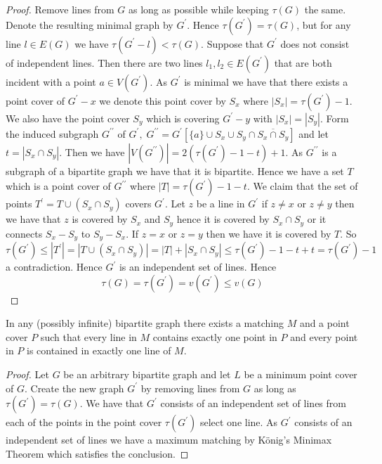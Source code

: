 \documentclass[12pt]{article}
\newenvironment{theorem}[2][Theorem]{\begin{trivlist}
\item[\hskip \labelsep {\bfseries #1}\hskip \labelsep {\bfseries #2.}]}{\end{trivlist}}
\begin{document}
\begin{proof}
    Remove lines from $G$ as long as possible while keeping $\tau(G)$ the same. Denote the resulting minimal graph by $G^\prime$. Hence $\tau(G^\prime)=\tau(G)$, but for any line $l\in E(G)$ we have $\tau(G^\prime -l)<\tau(G)$. Suppose that $G^\prime$ does not consist of independent lines. Then there are two lines $l_1, l_2 \in E(G^\prime)$ that are both incident with a point $a \in V(G^\prime)$. As $G^\prime$ is minimal we have that there exists a point cover of $G^\prime-x$ we denote this point cover by $S_x$ where $|S_x|=\tau(G^\prime)-1$. We also have the point cover $S_y$ which is covering $G^\prime -y$ with $|S_x|=|S_y|$.
    Form the induced subgraph $G^{\prime \prime}$ of $G^\prime, \; G^{\prime \prime}=G^\prime[\{a\}\cup S_x\cup S_y \cap \overline{S_x \cap S_y}]$ and let $t=|S_x \cap S_y|$. Then we have $|V(G^{\prime \prime})|=2(\tau(G^\prime)-1 -t)+1$. As $G^{\prime \prime}$ is a subgraph of a bipartite graph we have that it is bipartite. Hence we have a set $T$ which is a point cover of $G^{\prime \prime}$ where $|T|=\tau(G^\prime)-1 -t$.
    We claim that the set of points $T^\prime = T \cup (S_x \cap S_y)$ covers $G^\prime$. Let $z$ be a line in $G^\prime$ if $z\not = x $ or $z\not = y$ then we have that $z$ is covered by $S_x$ and $S_y$ hence it is covered by $S_x \cap S_y$ or it connects $S_x-S_y$ to $S_y-S_x$. If $z=x$ or $z=y$ then we have it is covered by $T$. So $\tau(G^\prime)\leq |T^\prime|= |T\cup (S_x\cap S_y)|=|T|+|S_x\cap S_y|\leq\tau(G^\prime)-1-t+t=\tau(G^\prime)-1$ a contradiction. Hence $G^\prime$ is an independent set of lines. Hence $$\tau(G)=\tau(G^\prime)=v(G^\prime)\leq v(G)$$

\end{proof}


\begin{theorem}
    {1.1.2}

    In any (possibly infinite) bipartite graph there exists a matching $M$ and a point cover $P$ such that every line in $M$ contains exactly one point in $P$ and every point in $P$ is contained in exactly one line of $M$.
\end{theorem}

\begin{proof}
    Let $G$ be an arbitrary bipartite graph and let $L$ be a minimum point cover of $G$. Create the new graph $G^{\prime}$ by removing lines from $G$ as long as $\tau(G^\prime)=\tau(G)$. We have that $G^\prime$ consists of an independent set of lines from each of the points in the point cover $\tau(G^\prime)$ select one line. As $G^{\prime}$ consists of an independent set of lines we have a maximum matching by König's Minimax Theorem which satisfies the conclusion.
\end{proof}
\end{document}

